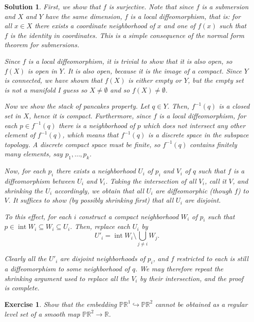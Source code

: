 \documentclass{article}
\newtheorem{ex}{Exercise}
\theoremstyle{nonumberplain}
\newtheorem{sol}{Solution}
\newcommand{\R}{\mathbb{R}}
\newcommand{\PP}{\mathbb{P}}
\DeclareMathOperator{\inte}{int}
\begin{document}
\begin{sol}
First, we show that $f$ is surjective. Note that since $f$ is a submersion and $X$ and $Y$ have the same dimension, $f$ is a local diffeomorphism, that is: for all $x \in X$ there exists a coordinate neighborhood of $x$ and one of $f(x)$ such that $f$ is the identity in coordinates. This is a simple consequence of the normal form theorem for submersions.

Since $f$ is a local diffeomorphism, it is trivial to show that it is also open, so $f(X)$ is open in $Y$. It is also open, because it is the image of a compact. Since $Y$ is connected, we have shown that $f(X)$ is either empty or $Y$, but the empty set is not a manifold I guess so $X \neq \emptyset$ and so $f(X) \neq \emptyset$.

Now we show the stack of pancakes property. Let $q \in Y$. Then, $f^{-1}(q)$ is a closed set in $X$, hence it is compact. Furthermore, since $f$ is a local diffeomorphism, for each $p \in f^{-1}(q)$ there is a neighborhood of $p$ which does not intersect any other element of $f^{-1}(q)$, which means that $f^{-1}(q)$ is a discrete space in the subspace topology. A discrete compact space must be finite, so $f^{-1}(q)$ contains finitely many elements, say $p_1, \dots, p_k$.

Now, for each $p_i$ there exists a neighborhood $U_i$ of $p_i$ and $V_i$ of $q$ such that $f$ is a diffeomorphism between $U_i$ and $V_i$. Taking the intersection of all $V_i$, call it $V$, and shrinking the $U_i$ accordingly, we obtain that all $U_i$ are diffeomorphic (though $f$) to $V$. It suffices to show (by possibly shrinking first) that all $U_i$ are disjoint.

To this effect, for each $i$ construct a compact neighborhood $W_i$ of $p_i$ such that $p \in \inte W_i \subseteq W_i \subseteq U_i$. Then, replace each $U_i$ by
\[U'_i = \inte W_i \setminus \bigcup_{j \neq i} W_j.\]

Clearly all the $U'_i$ are disjoint neighborhoods of $p_i$, and $f$ restricted to each is still a diffeomorphism to some neighborhood of $q$. We may therefore repeat the shrinking argument used to replace all the $V_i$ by their intersection, and the proof is complete.
\end{sol}

\begin{ex}
Show that the embedding $\PP\R^1 \hookrightarrow \PP\R^2$ cannot be obtained as a regular level set of a smooth map $\PP\R^2 \to \R$.
\end{ex}
\end{document}

